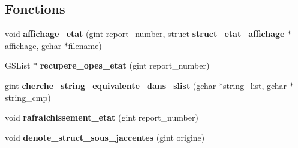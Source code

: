\subsection*{Fonctions}
\begin{DoxyCompactItemize}
\item 
void {\bf affichage\_\-etat} (gint report\_\-number, struct {\bf struct\_\-etat\_\-affichage} $\ast$affichage, gchar $\ast$filename)
\item 
GSList $\ast$ {\bf recupere\_\-opes\_\-etat} (gint report\_\-number)
\item 
gint {\bf cherche\_\-string\_\-equivalente\_\-dans\_\-slist} (gchar $\ast$string\_\-list, gchar $\ast$string\_\-cmp)
\item 
void {\bf rafraichissement\_\-etat} (gint report\_\-number)
\item 
void {\bf denote\_\-struct\_\-sous\_\-jaccentes} (gint origine)
\end{DoxyCompactItemize}
